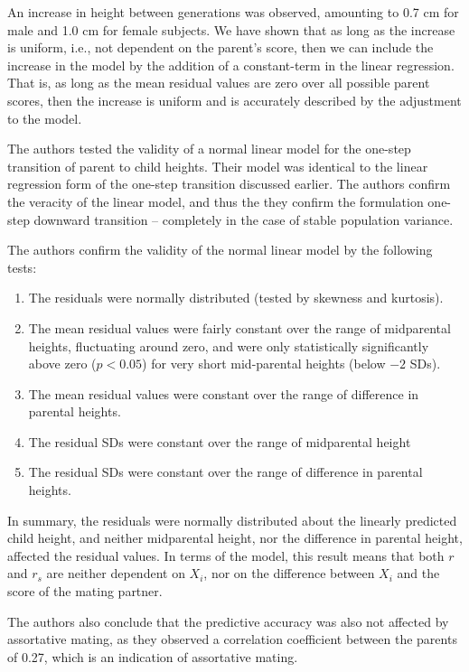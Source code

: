 \documentclass[a4paper,11pt]{article} %
\begin{document}
An increase in height between generations was observed, amounting to 0.7 cm for male and 1.0 cm for female subjects. We have shown that as long as the increase is uniform, i.e., not dependent on the parent's score, then we can include the increase in the model by the addition of a constant-term in the linear regression. That is, as long as the mean residual values are zero over all possible parent scores, then the increase is uniform and is accurately described by the adjustment to the model.

The authors tested the validity of a normal linear model for the one-step transition of parent to child heights. Their model was identical to the linear regression form of the one-step transition discussed earlier. The authors confirm the veracity of the linear model, and thus the they confirm the formulation one-step downward transition -- completely in the case of stable population variance.

The authors confirm the validity of the normal linear model by the following tests:
\begin{enumerate}
\item The residuals were normally distributed (tested by skewness and kurtosis).
\item The mean residual values were fairly constant over the range of midparental heights, fluctuating around zero, and were only statistically significantly above zero ($p < 0.05$) for very short mid-parental heights (below $-2$ SDs).
\item The mean residual values were constant over the range of difference in parental heights.
\item The residual SDs were constant over the range of midparental height  
\item The residual SDs were constant over the range of difference in parental heights.
\end{enumerate}

In summary, the residuals were normally distributed about the linearly predicted child height, and neither midparental height, nor the difference in parental height, affected the residual values. In terms of the model, this result means that both $r$ and $r_s$ are neither dependent on $X_i$, nor on the difference between $X_i$ and the score of the mating partner. 

The authors also conclude that the predictive accuracy was also not affected by assortative mating, as they observed a correlation coefficient between the parents of 0.27, which is an indication of assortative mating.
\end{document}
